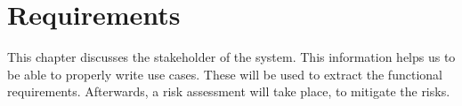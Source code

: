 \chapter{Requirements}
\label{ch:requirements}
This chapter discusses the stakeholder of the system. This information helps us to be able to properly write use cases. These will be used to extract the functional requirements. Afterwards, a risk assessment will take place, to mitigate the risks.



%
















